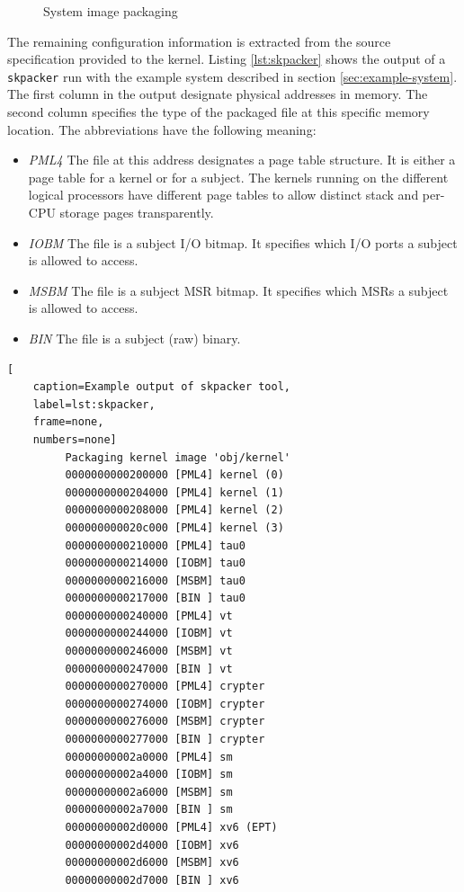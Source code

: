 \begin{figure}[h]
	\centering
	
	\caption{System image packaging}
	\label{fig:image-packaging}
\end{figure}

The remaining configuration information is extracted from the source
specification provided to the kernel. Listing \ref{lst:skpacker} shows the
output of a \texttt{skpacker} run with the example system described in section
\ref{sec:example-system}. The first column in the output designate physical
addresses in memory. The second column specifies the type of the packaged file
at this specific memory location. The abbreviations have the following meaning:

\begin{itemize}
	\item \emph{PML4} The file at this address designates a page table
		structure. It is either a page table for a kernel or for a subject. The
		kernels running on the different logical processors have different page
		tables to allow distinct stack and per-CPU storage pages transparently.
	\item \emph{IOBM} The file is a subject I/O bitmap. It specifies which I/O
		ports a subject is allowed to access.
	\item \emph{MSBM} The file is a subject MSR bitmap. It specifies which MSRs
		a subject is allowed to access.
	\item \emph{BIN} The file is a subject (raw) binary.
\end{itemize}

\begin{lstlisting}[
	caption=Example output of skpacker tool,
	label=lst:skpacker,
	frame=none,
	numbers=none]
         Packaging kernel image 'obj/kernel'
         0000000000200000 [PML4] kernel (0)
         0000000000204000 [PML4] kernel (1)
         0000000000208000 [PML4] kernel (2)
         000000000020c000 [PML4] kernel (3)
         0000000000210000 [PML4] tau0
         0000000000214000 [IOBM] tau0
         0000000000216000 [MSBM] tau0
         0000000000217000 [BIN ] tau0
         0000000000240000 [PML4] vt
         0000000000244000 [IOBM] vt
         0000000000246000 [MSBM] vt
         0000000000247000 [BIN ] vt
         0000000000270000 [PML4] crypter
         0000000000274000 [IOBM] crypter
         0000000000276000 [MSBM] crypter
         0000000000277000 [BIN ] crypter
         00000000002a0000 [PML4] sm
         00000000002a4000 [IOBM] sm
         00000000002a6000 [MSBM] sm
         00000000002a7000 [BIN ] sm
         00000000002d0000 [PML4] xv6 (EPT)
         00000000002d4000 [IOBM] xv6
         00000000002d6000 [MSBM] xv6
         00000000002d7000 [BIN ] xv6
\end{lstlisting}

